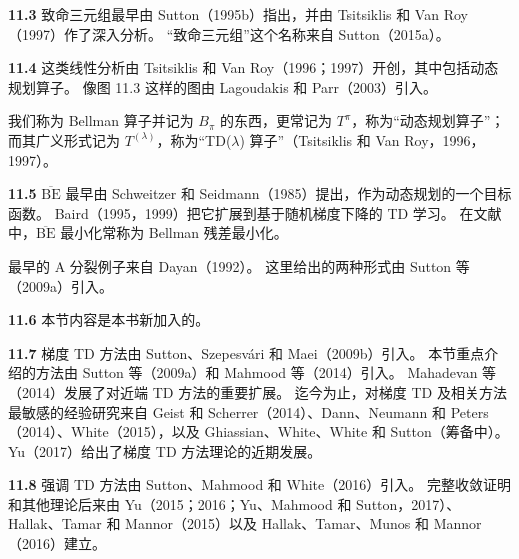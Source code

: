 \documentclass[UTF8,12pt,a4paper,fontset=fandol]{ctexart}
\begin{document}
\noindent\textbf{11.3}
致命三元组最早由 Sutton（1995b）指出，并由 Tsitsiklis 和 Van Roy（1997）作了深入分析。
“致命三元组”这个名称来自 Sutton（2015a）。

\noindent\textbf{11.4}
这类线性分析由 Tsitsiklis 和 Van Roy（1996；1997）开创，其中包括动态规划算子。
像图 11.3 这样的图由 Lagoudakis 和 Parr（2003）引入。

我们称为 Bellman 算子并记为 $B_\pi$ 的东西，更常记为 $T^\pi$，称为“动态规划算子”；而其广义形式记为 $T^{(\lambda)}$，称为“TD($\lambda$) 算子”（Tsitsiklis 和 Van Roy，1996，1997）。

\noindent\textbf{11.5}
$\overline{\mathrm{BE}}$ 最早由 Schweitzer 和 Seidmann（1985）提出，作为动态规划的一个目标函数。
Baird（1995，1999）把它扩展到基于随机梯度下降的 TD 学习。
在文献中，$\overline{\mathrm{BE}}$ 最小化常称为 Bellman 残差最小化。

最早的 A 分裂例子来自 Dayan（1992）。
这里给出的两种形式由 Sutton 等（2009a）引入。

\noindent\textbf{11.6}
本节内容是本书新加入的。

\noindent\textbf{11.7}
梯度 TD 方法由 Sutton、Szepesvári 和 Maei（2009b）引入。
本节重点介绍的方法由 Sutton 等（2009a）和 Mahmood 等（2014）引入。
Mahadevan 等（2014）发展了对近端 TD 方法的重要扩展。
迄今为止，对梯度 TD 及相关方法最敏感的经验研究来自 Geist 和 Scherrer（2014）、Dann、Neumann 和 Peters（2014）、White（2015），以及 Ghiassian、White、White 和 Sutton（筹备中）。
Yu（2017）给出了梯度 TD 方法理论的近期发展。

\noindent\textbf{11.8}
强调 TD 方法由 Sutton、Mahmood 和 White（2016）引入。
完整收敛证明和其他理论后来由 Yu（2015；2016；Yu、Mahmood 和 Sutton，2017）、Hallak、Tamar 和 Mannor（2015）以及 Hallak、Tamar、Munos 和 Mannor（2016）建立。
\end{document}

